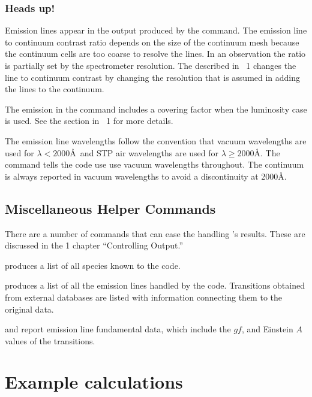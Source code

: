 \documentclass[12pt,twoside]{article}
\begin{document}
{\subsubsection{Heads up!}

Emission lines appear in the output produced by the
 command.
The emission line to continuum contrast ratio depends on the size
of the continuum mesh because the continuum cells are too coarse to resolve
the lines.  
In an observation the ratio is partially set by the spectrometer resolution.
The  described in \Hazy\ 1 changes the 
line to continuum contrast by changing the
resolution that is assumed in adding the lines to the continuum.  

The emission in the  command includes
a covering factor when the luminosity case is used.  
See the section  in \Hazy\ 1 for more details.

The emission line wavelengths follow the convention that vacuum wavelengths
are used for $\lambda < 2000$\AA\ and STP air wavelengths are used
for $\lambda \ge 2000$\AA.
The  command tells the code use use vacuum wavelengths throughout.
The continuum is always reported in vacuum wavelengths to avoid 
a discontinuity at 2000\AA.

\subsection{Miscellaneous Helper Commands}
\label{sec:MiscHelperCommands}

There are a number of commands that can ease the handling \Cloudy's results.
These are discussed in the \Hazy{} 1 chapter ``Controlling Output.'' 

 produces a list of all species
known to the code.

 produces a list of all the emission lines
handled by the code.  Transitions obtained from external databases are
listed with information connecting them to the original data.

 and  report
emission line fundamental data, which include the $gf$, and Einstein
$A$ values of the transitions.

\section{Example calculations}
\label{sec:ExampleCalculations}

}
\end{document}
